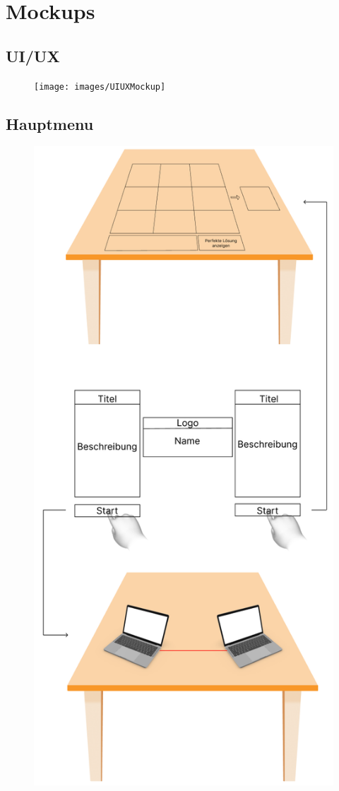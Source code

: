 \chapter{Mockups}

\section{UI/UX}
\begin{figure}[H]
    \centering
    \texttt{[image: images/UIUXMockup]}
\end{figure}
\newpage

\section{Hauptmenu}
\begin{figure}[H]
    \centering
    \includegraphics[scale=1, angle=90]{images/HauptmenuMockup}
\end{figure}
